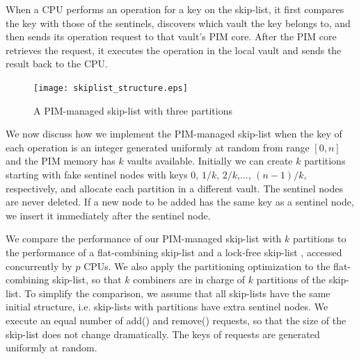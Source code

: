 When a CPU performs an operation for a key on the skip-list,
it first compares the key with those of the sentinels, discovers which vault
the key belongs to, and then sends its operation request to that vault's PIM core.
After the PIM core retrieves the request, it executes the operation in the local vault 
and sends the result back to the CPU.


\begin{figure}[ht!]
\centering
\texttt{[image: skiplist\_structure.eps]}
\caption{A PIM-managed skip-list with three partitions}
\label{figure:skiplist_structure}
\end{figure}

We now discuss how we implement the PIM-managed skip-list
when the key of each operation is an integer generated uniformly at random
from range $[0, n]$ and the PIM memory has $k$ vaults available.
Initially we can create $k$ partitions starting with fake sentinel nodes
with keys $0$, $1/k$, $2/k$,..., $(n-1)/k$, respectively, 
and allocate each partition in a different vault. 
The sentinel nodes are never deleted.
If a new node to be added has the same key as a sentinel node,
we insert it immediately after the sentinel node.

We compare the performance of our PIM-managed skip-list with $k$ partitions 
to the performance of a flat-combining skip-list \cite{Hendler10}
and a lock-free skip-list \cite{Herlihy08}, 
accessed concurrently by $p$ CPUs.
We also apply the partitioning optimization to the flat-combining skip-list, 
so that $k$ combiners are in charge of $k$ partitions of the skip-list. 
To simplify the comparison, we assume that all skip-lists have the same
initial structure, i.e. skip-lists with partitions have extra sentinel nodes.
We execute an equal number of add() and remove() requests, so that the size of the 
skip-list does not change dramatically. 
The keys of requests are generated uniformly at random. 

